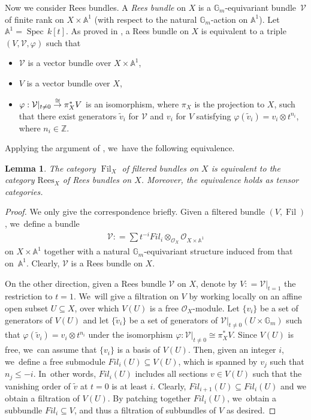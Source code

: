 \documentclass[11pt]{article}
\numberwithin{equation}{section}
\newcommand{\Fil}{\textit{Fil}}
\newcommand\To[1]{\mathchoice{\xrightarrow{\textstyle\kern4pt#1\kern3pt}}{\stackrel{#1}{\to}}{}{}}
\newcommand{\Rees}{\mathrm{Rees}}
\DeclareMathOperator{\Filt}{Fil}
\DeclareMathOperator{\Spec}{Spec}
\theoremstyle{plain}
\newtheorem{lem}[thm]{Lemma}
\theoremstyle{definition}
\begin{document}
Now we consider Rees bundles. A \emph{Rees bundle} on $X$ is a $\mathbb{G}_m$-equivariant bundle~$\mathcal{V}$ of finite rank on $X \times \mathbb{A}^1$ (with respect to the natural $\mathbb{G}_m$-action on $\mathbb{A}^1$). Let $\mathbb{A}^1 = \Spec \, k[t]$. As proved in \cite[Lem.\,2.1.3]{Lo17b}, a Rees bundle on $X$ is equivalent to a triple $(V,\mathcal{V},\varphi)$ such that
\begin{itemize}
\item $\mathcal{V}$ is a vector bundle over $X \times \mathbb{A}^1$,
\item $V$ is a vector bundle over $X$,
\item $\varphi: \mathcal{V}|_{t \neq 0} \To{\cong} \pi_X^* V$ is an isomorphism, where $\pi_X$ is the projection to $X$, such that there exist generators $\widetilde{v}_i$ for $\mathcal{V}$ and $v_i$ for $V$ satisfying $\varphi(\widetilde{v}_i) = v_i \otimes t^{n_i}$, where $n_i \in \mathbb{Z}$.
\end{itemize}
Applying the argument of \cite[Prop.\,2.1.5]{Lo17b}, we~have the following equivalence.

\begin{lem}\label{lem_rees_fil}
The category $\Filt_X$ of filtered bundles on $X$ is equivalent to the category $\Rees_X$ of Rees bundles on $X$. Moreover, the equivalence holds as tensor categories.
\end{lem}

\begin{proof}
We only give the correspondence briefly. Given a filtered bundle $(V, \Filt)$, we~define a bundle
\begin{align*}
\mathcal{V}: = \sum t^{-i} \Fil_{i} \otimes_{\mathcal{O}_X} \mathcal{O}_{X \times \mathbb{A}^1}
\end{align*}
on $X \times \mathbb{A}^1$ together with a natural $\mathbb{G}_m$-equivariant structure induced from that on~$\mathbb{A}^1$. Clearly, $\mathcal{V}$ is a Rees bundle on $X$.

On the other direction, given a Rees bundle $\mathcal{V}$ on $X$, denote by $V: = \mathcal{V}|_{t = 1}$ the restriction to $t=1$. We~will give a filtration on $V$ by working locally on an affine open subset $U \subseteq X$, over which $V(U)$ is a free $\mathcal{O}_X$-module. Let $\{v_i\}$ be a set of generators of $V(U)$ and let $\{\widetilde{v}_i\}$ be a set of generators of $\mathcal{V}|_{t \neq 0} (U \times \mathbb{G}_m)$ such that $\varphi(\widetilde{v}_i) = v_i \otimes t^{n_i}$ under the isomorphism $\varphi: \mathcal{V}|_{t \neq 0} \cong \pi^*_X V$. Since $V(U)$ is free, we~can assume that $\{v_i\}$ is a basis of $V(U)$. Then, given an integer $i$, we~define a free submodule $\Fil_i(U) \subseteq V(U)$, which is spanned by $v_j$ such that $n_j \leq -i$. In~other words, $\Fil_i(U)$ includes all sections $v \in V(U)$ such that the vanishing order of $\widetilde{v}$ at $t=0$ is at least $i$. Clearly, $\Fil_{i+1}(U) \subseteq \Fil_{i}(U)$ and we obtain a filtration of $V(U)$. By patching together $\Fil_i(U)$, we~obtain a subbundle $\Fil_i \subseteq V$, and thus a filtration of subbundles of $V$ as desired.
\end{proof}
\end{document}
